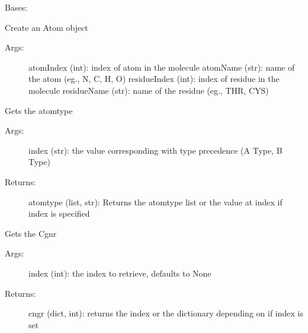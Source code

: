 \documentclass[letterpaper,10pt,english]{sphinxmanual}
\begin{document}
\begin{fulllineitems}
\label{atom:ctools.Atom.Atom}
Bases: 

Create an Atom object
\begin{description}
\item[{Args:}] \leavevmode
atomIndex (int): index of atom in the molecule
atomName (str): name of the atom (eg., N, C, H, O) 
residueIndex (int): index of residue in the molecule
residueName (str): name of the residue (eg., THR, CYS)

\end{description}


\begin{fulllineitems}
\label{atom:ctools.Atom.Atom.getAtomType}
Gets the atomtype
\begin{description}
\item[{Args:}] \leavevmode
index (str): the value corresponding with type precedence (A Type, B Type)

\item[{Returns:}] \leavevmode
atomtype (list, str): Returns the atomtype list or the value at index if index is specified

\end{description}

\end{fulllineitems}



\begin{fulllineitems}
\label{atom:ctools.Atom.Atom.getCgnr}
Gets the Cgnr
\begin{description}
\item[{Args:}] \leavevmode
index (int): the index to retrieve, defaults to None

\item[{Returns:}] \leavevmode
cngr (dict, int): returns the index or the dictionary depending on if index is set

\end{description}

\end{fulllineitems}



\end{fulllineitems}
\end{document}
